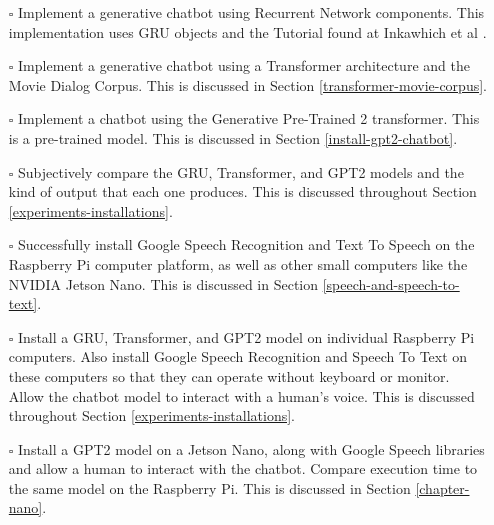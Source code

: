 \begin{itemize}
	
	\item[\rlap{\raisebox{0.3ex}{\hspace{0.4ex}\tiny \ding{52}}}$\square$] Implement a generative chatbot using Recurrent Network components. This implementation uses GRU objects and the Tutorial found at Inkawhich et al \cite{2018Inkawhich}.
	
	\item[\rlap{\raisebox{0.3ex}{\hspace{0.4ex}\tiny \ding{52}}}$\square$] Implement a generative chatbot using a Transformer architecture and the Movie Dialog Corpus. This is discussed in Section \ref{transformer-movie-corpus}. %
	
	\item[\rlap{\raisebox{0.3ex}{\hspace{0.4ex}\tiny \ding{52}}}$\square$] Implement a chatbot using the Generative Pre-Trained 2 transformer. This is a pre-trained model. This is discussed in Section \ref{install-gpt2-chatbot}.
	
	\item[\rlap{\raisebox{0.3ex}{\hspace{0.4ex}\tiny \ding{52}}}$\square$] Subjectively compare the GRU, Transformer, and GPT2 models and the kind of output that each one produces. This is discussed throughout Section \ref{experiments-installations}.
	
	\item[\rlap{\raisebox{0.3ex}{\hspace{0.4ex}\tiny \ding{52}}}$\square$] Successfully install Google Speech Recognition and Text To Speech on the Raspberry Pi computer platform, as well as other small computers like the NVIDIA Jetson Nano. This is discussed in Section \ref{speech-and-speech-to-text}.
	
	\item[\rlap{\raisebox{0.3ex}{\hspace{0.4ex}\tiny \ding{52}}}$\square$] Install a GRU, Transformer, and GPT2 model on individual Raspberry Pi computers. Also install Google Speech Recognition and Speech To Text on these computers so that they can operate without keyboard or monitor. Allow the chatbot model to interact with a human's voice. This is discussed throughout Section \ref{experiments-installations}.
	
	\item[\rlap{\raisebox{0.3ex}{\hspace{0.4ex}\tiny \ding{52}}}$\square$] Install a GPT2 model on a Jetson Nano, along with Google Speech libraries and allow a human to interact with the chatbot. Compare execution time to the same model on the Raspberry Pi. This is discussed in Section \ref{chapter-nano}.
	

\end{itemize}
